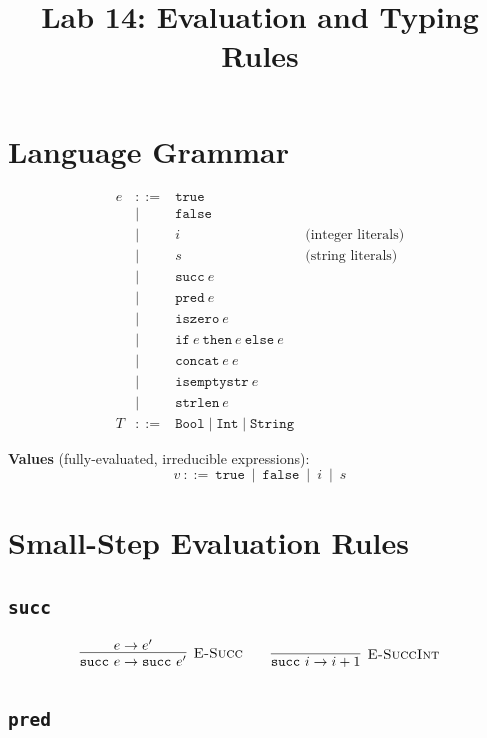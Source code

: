\documentclass[11pt]{article}
\title{Lab 14: Evaluation and Typing Rules}
\author{}
\date{}
\begin{document}
\maketitle

\section*{Language Grammar}

\[
\begin{array}{rcll}
e & ::= & \texttt{true} \\
  & \mid & \texttt{false} \\
  & \mid & i & \text{(integer literals)} \\
  & \mid & s & \text{(string literals)} \\
  & \mid & \texttt{succ}\ e \\
  & \mid & \texttt{pred}\ e \\
  & \mid & \texttt{iszero}\ e \\
  & \mid & \texttt{if}\ e\ \texttt{then}\ e\ \texttt{else}\ e \\
  & \mid & \texttt{concat}\ e\ e \\
  & \mid & \texttt{isemptystr}\ e \\
  & \mid & \texttt{strlen}\ e \\[6pt]
T & ::= & \texttt{Bool} \mid \texttt{Int} \mid \texttt{String}
\end{array}
\]

\noindent\textbf{Values} (fully-evaluated, irreducible expressions):
\[
v\ ::=\ \texttt{true}\ \mid\ \texttt{false}\ \mid\ i\ \mid\ s
\]

\section{Small-Step Evaluation Rules}

\subsection*{\texttt{succ}}

\[
\infer[\textsc{E-Succ}]
  {\texttt{succ}\ e \to \texttt{succ}\ e'}
  {e \to e'}
\qquad
\infer[\textsc{E-SuccInt}]
  {\texttt{succ}\ i \to i+1}
  {}
\]

\subsection*{\texttt{pred}}
\end{document}
